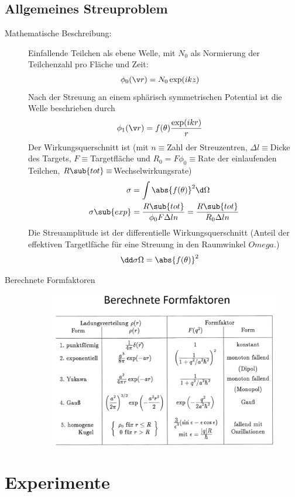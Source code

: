 \documentclass[twocolumn]{summery_4.1}
\begin{document}
\subsection{Allgemeines Streuproblem}
\begin{description}
    \item[Mathematische Beschreibung:]
    Einfallende Teilchen als ebene Welle, mit \(N_0\) als Normierung der Teilchenzahl pro Fläche und Zeit:
    \begin{align*}
        \phi_0(\v r) &= N_0 \exp(ikz) 
    \end{align*} 
    Nach der Streuung an einem sphärisch symmetrischen Potential ist die Welle beschrieben durch 
    \begin{align*}
        \phi_1(\v r) &= f(\theta)\frac{\exp(ikr)}{r}
    \end{align*}
    Der Wirkungsquerschnitt ist (mit \(n\equiv \)Zahl der Streuzentren, \(\Delta l\equiv\)Dicke des Targets, \(F\equiv\)Targetfläche und \(R_0=F\phi_0\equiv\)Rate der einlaufenden Teilchen, \(R\sub{tot}\equiv\)Wechselwirkungsrate)
    \begin{align*}
        \sigma &= \int \abs{f(\theta)}^2\d\Omega\\
        \sigma\sub{exp} &= \frac{R\sub{tot}}{\phi_0 F \Delta l n } = \frac{R\sub{tot}}{R_0 \Delta l n }
    \end{align*}
    Die Streuamplitude ist der differentielle Wirkungsquerschnitt (Anteil der effektiven Targetlfäche für eine Streuung
    in den Raumwinkel \(Omega\).)
    \begin{align*}
        \dd \sigma \Omega &= \abs{f(\theta)}^2
    \end{align*}
    \item[Berechnete Formfaktoren]
    \begin{figure}[H]
        \centering
        \includegraphics[width=.49\textwidth]{Tabelle_Streuung.png}
    \end{figure}
\end{description}


\section{Experimente}
\end{document}
